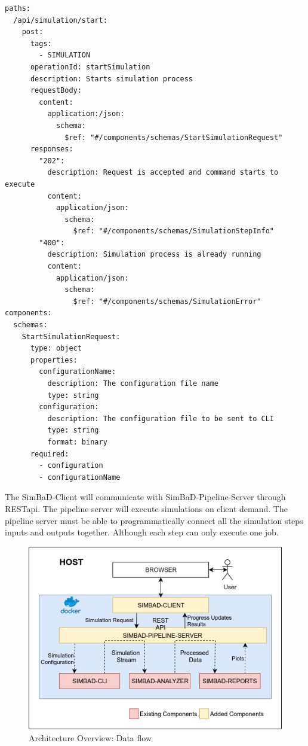 \begin{lstlisting}[label=list:openapi-route,caption=The OpenAPI route definition for simulation start, basicstyle=\footnotesize\ttfamily]
paths:
  /api/simulation/start:
    post:
      tags:
        - SIMULATION
      operationId: startSimulation
      description: Starts simulation process
      requestBody:
        content:
          application:/json:
            schema:
              $ref: "#/components/schemas/StartSimulationRequest"
      responses:
        "202":
          description: Request is accepted and command starts to execute
          content:
            application/json:
              schema:
                $ref: "#/components/schemas/SimulationStepInfo"
        "400":
          description: Simulation process is already running
          content:
            application/json:
              schema:
                $ref: "#/components/schemas/SimulationError"
components:
  schemas:
    StartSimulationRequest:
      type: object
      properties:
        configurationName:
          description: The configuration file name
          type: string
        configuration:
          description: The configuration file to be sent to CLI
          type: string
          format: binary
      required:
        - configuration
        - configurationName
\end{lstlisting}
The SimBaD-Client will communicate with SimBaD-Pipeline-Server through RESTapi. The pipeline server will execute simulations on client demand. The pipeline server must be able to programmatically connect all the simulation steps inputs and outputs together. Although each step can only execute one job.
\begin{figure}[h!]
	\centering
		\includegraphics[width=0.9\linewidth]{diagrams/arch3.png}
	\caption{Architecture Overview: Data flow}
	\label{fig:arch3}
\end{figure}
